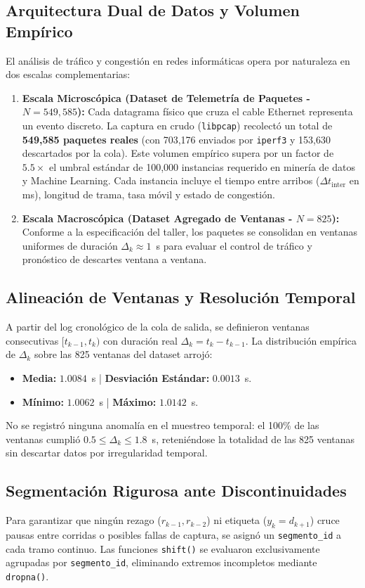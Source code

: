 \documentclass[11pt,a4paper]{article}
\begin{document}
\subsection{Arquitectura Dual de Datos y Volumen Empírico}
El análisis de tráfico y congestión en redes informáticas opera por naturaleza en dos escalas complementarias:
\begin{enumerate}
    \item \textbf{Escala Microscópica (Dataset de Telemetría de Paquetes - $N = 549,585$):} Cada datagrama físico que cruza el cable Ethernet representa un evento discreto. La captura en crudo (\texttt{libpcap}) recolectó un total de \textbf{549,585 paquetes reales} (con 703,176 enviados por \texttt{iperf3} y 153,630 descartados por la cola). Este volumen empírico supera por un factor de $5.5\times$ el umbral estándar de 100,000 instancias requerido en minería de datos y Machine Learning. Cada instancia incluye el tiempo entre arribos ($\Delta t_{\text{inter}}$ en ms), longitud de trama, tasa móvil y estado de congestión.
    \item \textbf{Escala Macroscópica (Dataset Agregado de Ventanas - $N = 825$):} Conforme a la especificación del taller, los paquetes se consolidan en ventanas uniformes de duración $\Delta_k \approx 1$~s para evaluar el control de tráfico y pronóstico de descartes ventana a ventana.
\end{enumerate}

\subsection{Alineación de Ventanas y Resolución Temporal}
A partir del log cronológico de la cola de salida, se definieron ventanas consecutivas $[t_{k-1}, t_k)$ con duración real $\Delta_k = t_k - t_{k-1}$. La distribución empírica de $\Delta_k$ sobre las 825 ventanas del dataset arrojó:
\begin{itemize}
    \item \textbf{Media:} $1.0084$~s | \textbf{Desviación Estándar:} $0.0013$~s.
    \item \textbf{Mínimo:} $1.0062$~s | \textbf{Máximo:} $1.0142$~s.
\end{itemize}
No se registró ninguna anomalía en el muestreo temporal: el 100\% de las ventanas cumplió $0.5 \le \Delta_k \le 1.8$~s, reteniéndose la totalidad de las 825 ventanas sin descartar datos por irregularidad temporal.

\subsection{Segmentación Rigurosa ante Discontinuidades}
Para garantizar que ningún rezago ($r_{k-1}, r_{k-2}$) ni etiqueta ($y_k = d_{k+1}$) cruce pausas entre corridas o posibles fallas de captura, se asignó un \texttt{segmento\_id} a cada tramo continuo. Las funciones \texttt{shift()} se evaluaron exclusivamente agrupadas por \texttt{segmento\_id}, eliminando extremos incompletos mediante \texttt{dropna()}.
\end{document}
